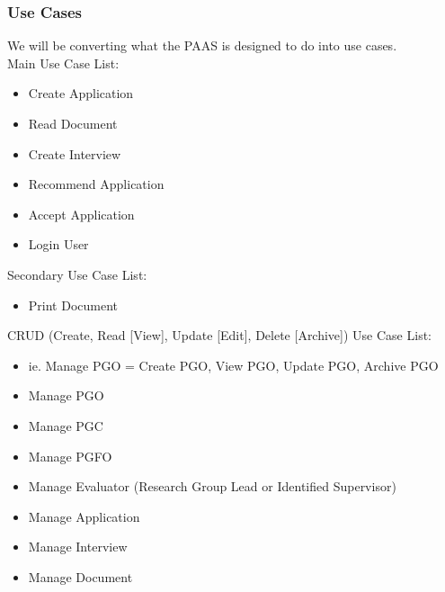 \documentclass{article}
\begin{document}
\subsubsection{Use Cases}
We will be converting what the PAAS is designed to do into use cases. \\
Main Use Case List: 
\begin{itemize}
\item Create Application
\item Read Document
\item Create Interview
\item Recommend Application
\item Accept Application
\item Login User \\
\end{itemize}
Secondary Use Case List: 
\begin{itemize}
\item Print Document \\
\end{itemize}
CRUD (Create, Read [View], Update [Edit], Delete [Archive]) Use Case List:
\begin{itemize}
\item ie. Manage PGO = Create PGO, View PGO, Update PGO, Archive PGO
\item Manage PGO 
\item Manage PGC
\item Manage PGFO
\item Manage Evaluator (Research Group Lead or Identified Supervisor)
\item Manage Application
\item Manage Interview
\item Manage Document
\end{itemize}
\end{document}
